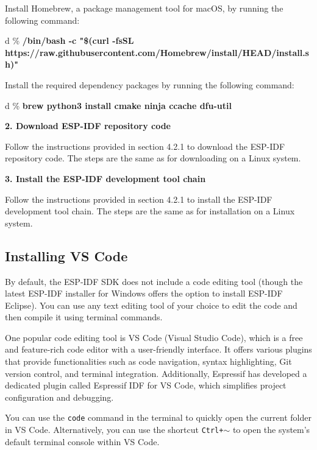 \documentclass[a4paper,12pt]{book}
\begin{document}
Install Homebrew, a package management tool for macOS, by running the following command:

\begin{codebloc}
\begin{tabular}{d}
\% \textbf{/bin/bash -c "\$(curl -fsSL https://raw.githubusercontent.com/Homebrew/install/\newline HEAD/install.sh)"}
\end{tabular}
\end{codebloc}

Install the required dependency packages by running the following command:

\begin{codebloc}
\begin{tabular}{d}
\% \textbf{brew python3 install cmake ninja ccache dfu-util}
\end{tabular}
\end{codebloc}

\textbf{2. Download ESP-IDF repository code}

Follow the instructions provided in section 4.2.1 to download the ESP-IDF repository code. The steps are the same as for downloading on a Linux system.

\textbf{3. Install the ESP-IDF development tool chain}

Follow the instructions provided in section 4.2.1 to install the ESP-IDF development tool chain. The steps are the same as for installation on a Linux system.

\subsection{Installing VS Code}
By default, the ESP-IDF SDK does not include a code editing tool (though the latest ESP-IDF installer for Windows offers the option to install ESP-IDF Eclipse). You can use any text editing tool of your choice to edit the code and then compile it using terminal commands.

One popular code editing tool is VS Code (Visual Studio Code), which is a free and feature-rich code editor with a user-friendly interface. It offers various plugins that provide functionalities such as code navigation, syntax highlighting, Git version control, and terminal integration. Additionally, Espressif has developed a dedicated plugin called Espressif IDF for VS Code, which simplifies project configuration and debugging.

You can use the \verb|code| command in the terminal to quickly open the current folder in VS Code. Alternatively, you can use the shortcut \texttt{Ctrl+$\sim$} to open the system’s default terminal console within VS Code.
\end{document}
